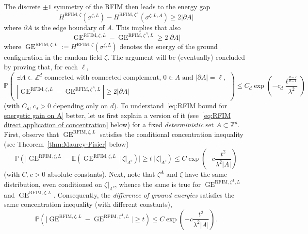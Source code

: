 \documentclass[11pt, reqno]{amsart}
\newcommand{\Z}{\mathbb{Z}}
\newcommand{\E}{\mathbb{E}}
\DeclareMathOperator{\GE}{GE}
\renewcommand{\P}{\mathbb{P}}
\numberwithin{equation}{section}
\begin{document}
The discrete $\pm1$ symmetry of the RFIM then leads to the energy gap
\begin{equation}
H^{\text{RFIM}, \zeta}(\sigma^{\zeta,L})-H^{\text{RFIM}, \zeta^A}(\sigma^{\zeta,L,A}) \ge 2|\partial A|
\end{equation}
where $\partial A$ is the edge boundary of $A$. This implies that also
\begin{equation}
\GE^{\text{RFIM}, \zeta,L}-\GE^{\text{RFIM}, \zeta^A,L} \ge 2|\partial A|
\end{equation}
where $\GE^{\text{RFIM}, \zeta,L}:=H^{\text{RFIM}, \zeta}(\sigma^{\zeta,L})$ denotes the energy of the ground configuration in the random field $\zeta$. The argument will be (eventually) concluded by proving that, for each $\ell$,
\begin{equation}\label{eq:RFIM bound for energetic gain on A}
\P\left(\substack{\exists A\subset\Z^d\text{ connected with connected complement, $0\in A$ and $|\partial A|=\ell$},\\
|\GE^{\text{RFIM}, \zeta,L}-\GE^{\text{RFIM}, \zeta^A,L}| \ge 2|\partial A|}\right)\le C_d\exp\left(-c_d\frac{\ell^{\frac{d-2}{d-1}}}{\lambda^2}\right) 
\end{equation}
(with $C_d,c_d>0$ depending only on $d$).
To understand~\eqref{eq:RFIM bound for energetic gain on A} better, let us first explain a version of it (see~\eqref{eq:RFIM direct application of concentration} below) for a fixed \emph{deterministic} set $A\subset\Z^d$. First, observe that $\GE^{\text{RFIM}, \zeta,L}$ satisfies the conditional concentration inequality (see Theorem~\ref{thm:Maurey-Pisier} below)
\begin{equation}\label{eq:RFIM concentration}
\P\left(\big|\GE^{\text{RFIM}, \zeta,L} - \E(\GE^{\text{RFIM}, \zeta,L}\,|\,\zeta|_{A^c})\big|\ge t\,|\, \zeta|_{A^c}\right)\le C\exp\left(-c\frac{t^2}{\lambda^2|A|}\right)
\end{equation}
(with $C,c>0$ absolute constants). Next, note that $\zeta^{A}$ and $\zeta$ have the same distribution, even conditioned on $\zeta|_{A^c}$, whence the same is true for $\GE^{\text{RFIM}, \zeta^{A},L}$ and $\GE^{\text{RFIM}, \zeta,L}$. 
Consequently, the \emph{difference of ground energies} satisfies the same concentration inequality (with different constants),
\begin{equation}\label{eq:RFIM GE concentration}
\P\left(\big|\GE^{\text{RFIM}, \zeta,L}-\GE^{\text{RFIM}, \zeta^{A},L}\big|\ge t\right)\le C\exp\left(-c\frac{t^2}{\lambda^2|A|}\right).
\end{equation}
\end{document}
